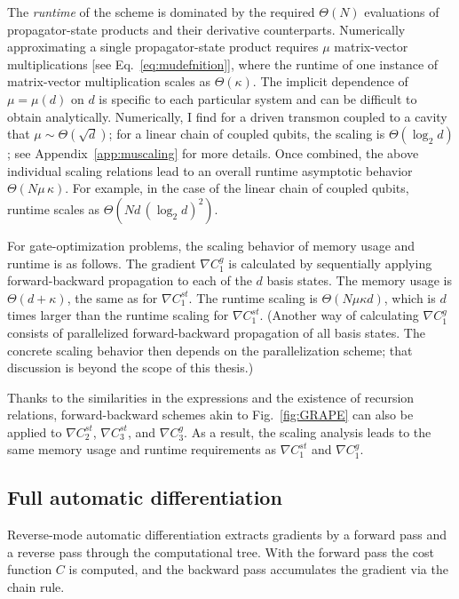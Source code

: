 The \textit{runtime} of the scheme is dominated by the required $\Theta(N)$ evaluations of propagator-state products and their derivative counterparts. Numerically approximating a single propagator-state product requires $\mu$ matrix-vector multiplications [see Eq.~\eqref{eq:mudefnition}], where the runtime of one instance of matrix-vector multiplication scales as $\Theta(\kappa)$.  The implicit dependence of $\mu=\mu(d)$ on $d$ is specific to each particular system and can be difficult to obtain analytically. Numerically, I find for a driven transmon coupled to a cavity that $\mu\sim\Theta(\sqrt{d})$; for a linear chain of coupled qubits, the scaling is $\Theta(\log_2 d)$; see Appendix~\ref{app:muscaling} for more details. 
Once combined, the above individual scaling relations lead to an overall runtime asymptotic behavior 
$\Theta(N\mu\, \kappa)$. For example, in the case of the linear chain of coupled qubits, runtime scales as $\Theta(Nd\, (\log_2 d )^2)$.

For gate-optimization problems, the scaling behavior of memory usage and runtime is as follows. The gradient $\nabla C_1^{ g}$ is calculated by sequentially 
applying forward-backward propagation to each of the $d$ basis states. The memory usage is $\Theta(d+\kappa)$, the same as for $\nabla C_1^{st}$. The runtime scaling is $\Theta(N\mu\kappa d)$, which is $d$ times larger than the runtime scaling for $\nabla C_1^{st}$. (Another way of calculating $\nabla C_1^{ g}$ consists of parallelized forward-backward propagation of all basis states. The concrete scaling behavior then depends on the parallelization scheme; that discussion is beyond the scope of this thesis.)

Thanks to the similarities in the expressions and the existence of recursion relations, forward-backward schemes akin to Fig.~\ref{fig:GRAPE} 
can also be applied to $\nabla C_2^{st}$, $\nabla C_3^{st}$, and $\nabla C_3^{g}$. As a result, the scaling analysis leads to the same memory usage and runtime requirements as $\nabla C_1^{st}$ and $\nabla C_1^{g}$.



\subsection{Full automatic differentiation}
\label{sec:fullAD_scaling}

Reverse-mode automatic differentiation extracts gradients by a forward pass and a reverse pass through the computational tree. With the forward pass the cost function $C$ is computed, and the backward pass accumulates the gradient via the chain rule.

